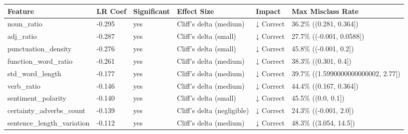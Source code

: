 \begin{tabular}{llllll}
\toprule
Feature & LR Coef & Significant & Effect Size & Impact & Max Misclass Rate \\
\midrule
noun\_ratio & -0.295 & yes & Cliff's delta (medium) & ↓ Correct & 36.2\% ((0.281, 0.364]) \\
adj\_ratio & -0.287 & yes & Cliff's delta (small) & ↓ Correct & 27.7\% ((-0.001, 0.0588]) \\
punctuation\_density & -0.276 & yes & Cliff's delta (small) & ↓ Correct & 45.8\% ((-0.001, 0.2]) \\
function\_word\_ratio & -0.261 & yes & Cliff's delta (medium) & ↓ Correct & 38.3\% ((0.301, 0.4]) \\
std\_word\_length & -0.177 & yes & Cliff's delta (medium) & ↓ Correct & 39.7\% ((1.5990000000000002, 2.77]) \\
verb\_ratio & -0.146 & yes & Cliff's delta (medium) & ↓ Correct & 44.4\% ((0.167, 0.364]) \\
sentiment\_polarity & -0.140 & yes & Cliff's delta (small) & ↓ Correct & 45.5\% ((0.0, 0.1]) \\
certainty\_adverbs\_count & -0.139 & yes & Cliff's delta (negligible) & ↓ Correct & 24.3\% ((-0.001, 2.0]) \\
sentence\_length\_variation & -0.112 & yes & Cliff's delta (medium) & ↓ Correct & 48.3\% ((3.054, 14.5]) \\
\bottomrule
\end{tabular}
